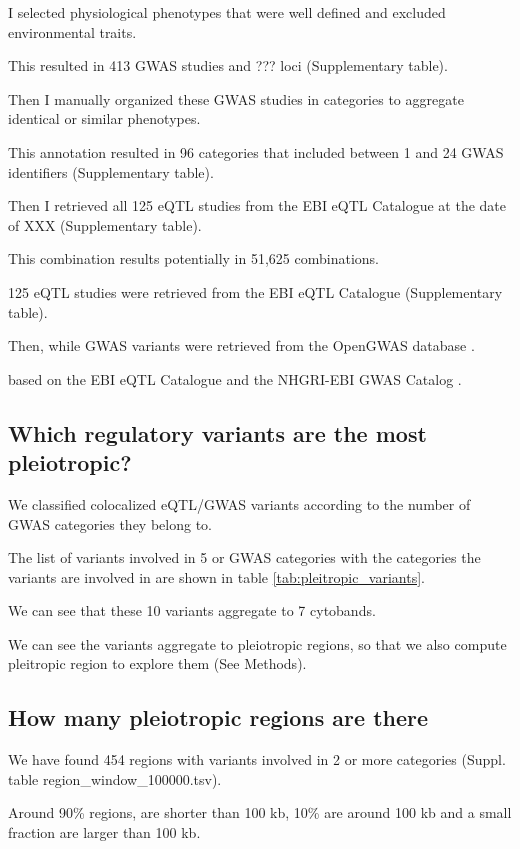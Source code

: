 I selected physiological phenotypes that were well defined and excluded environmental traits.

This resulted in 413 GWAS studies and ??? loci (Supplementary table).

Then I manually organized these GWAS studies in categories to aggregate identical or similar phenotypes.

This annotation resulted in 96 categories that included between 1 and 24 GWAS identifiers (Supplementary table).

Then I retrieved all 125 eQTL studies from the EBI eQTL Catalogue at the date of XXX (Supplementary table).

This combination results potentially in 51,625 combinations.

%
125 eQTL studies were retrieved from the EBI eQTL Catalogue (Supplementary table).

Then, while GWAS variants were retrieved from the OpenGWAS database \citep{2018.Parkinson.Buniello,2021.Alasoo.Kerimov}.

 based on the EBI eQTL Catalogue and the NHGRI-EBI GWAS Catalog \citep{2018.Parkinson.Buniello,2021.Alasoo.Kerimov}.


\subsection*{Which regulatory variants are the most pleiotropic?}

We classified colocalized eQTL/GWAS variants according to the number of GWAS categories they belong to.

The list of variants involved in 5 or GWAS categories with the categories the variants are involved in are shown in table \ref{tab:pleitropic_variants}.

We can see that these 10 variants aggregate to 7 cytobands.

We can see the variants aggregate to pleiotropic regions, so that we also compute pleitropic region to explore them (See Methods).

\subsection*{How many pleiotropic regions are there}

We have found 454 regions with variants involved in 2 or more categories (Suppl. table region_window_100000.tsv).

Around 90\% regions, are shorter than 100 kb, 10\% are around 100 kb and a small fraction are larger than 100 kb.

